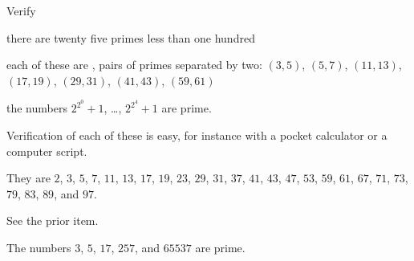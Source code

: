 \documentclass{ibl}  %
\begin{document}
\begin{problem}[\maxlength]
Verify 
\begin{items}
\item there are twenty five primes less than one hundred
\item each of these are , pairs of primes
  separated by two: $(3, 5)$, $(5, 7)$, $(11, 13)$, $(17, 19)$, 
  $(29, 31)$, $(41, 43)$, $(59, 61)$
\item the numbers $2^{2^0}+1$, \ldots, $2^{2^4}+1$ are prime.
\end{items}
\begin{answer}
Verification of each of these is easy, for instance with a pocket calculator
or a computer script.
\begin{items}
\item 
  They are $2$, $3$, $5$, $7$, $11$, $13$, $17$, $19$, $23$, $29$, $31$, 
  $37$, $41$, $43$, $47$, $53$, $59$, $61$, $67$, $71$, $73$, $79$, $83$, 
  $89$, and $97$.
\item 
  See the prior item.
\item
  The numbers $3$, $5$, $17$, $257$, and $65537$ are prime.
\end{items}
\end{answer}
\end{problem}
\end{document}
